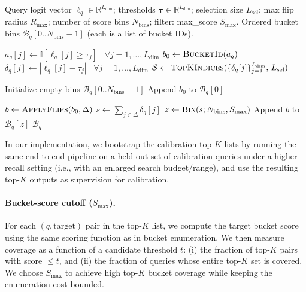 \documentclass[sigconf, nonacm]{acmart}
\begin{document}
\begin{algorithm}[t]
\caption{Bucket Enumeration around the Base Address}
\label{alg:bucket_enum}
\begin{algorithmic}[1]
\Require
Query logit vector $\boldsymbol{\ell}_q \in \mathbb{R}^{L_{\text{dim}}}$;
thresholds $\boldsymbol{\tau}\in\mathbb{R}^{L_{\text{dim}}}$;
selection size $L_{\text{sel}}$;
max flip radius $R_{\max}$;
number of score bins $N_{\text{bins}}$;
filter: max\_score $S_{\max}$.
\Ensure
Ordered bucket bins $\mathcal{B}_q[0..N_{\text{bins}}-1]$ (each is a list of bucket IDs).
 
\State $a_q[j] \gets \mathbb{I}\!\left[\ell_q[j] \ge \tau_j\right]\;\;\;\forall j=1,\dots,L_{\text{dim}}$
\State $b_0 \gets \textsc{BucketId}(a_q)$
\State $\delta_q[j] \gets \left|\ell_q[j]-\tau_j\right|\;\;\;\forall j=1,\dots,L_{\text{dim}}$
\State $\mathcal{S} \gets \textsc{TopKIndices}(\{\delta_q[j]\}_{j=1}^{L_{\text{dim}}},\, L_{\text{sel}})$
 
\State Initialize empty bins $\mathcal{B}_q[0..N_{\text{bins}}-1]$
\State Append $b_0$ to $\mathcal{B}_q[0]$ 
 
    \State $b \gets \textsc{ApplyFlips}(b_0, \Delta)$
    \State $s \gets \sum_{j\in\Delta}\delta_q[j]$
        \State $z \gets \textsc{Bin}(s; N_{\text{bins}}, S_{\max})$
        \State Append $b$ to $\mathcal{B}_q[z]$
    \EndIf
\EndFor
\State \Return $\mathcal{B}_q$
\end{algorithmic}
\end{algorithm}




In our implementation, we bootstrap the calibration top-$K$ lists by running the same end-to-end pipeline on a held-out set of calibration queries under a higher-recall setting (i.e., with an enlarged search budget/range), and use the resulting top-$K$ outputs as supervision for calibration.

\paragraph{Bucket-score cutoff ($S_{\max}$).}
For each $(q,\text{target})$ pair in the top-$K$ list, we compute the target bucket score using the same scoring function as in bucket enumeration.
We then measure coverage as a function of a candidate threshold $t$: (i) the fraction of top-$K$ pairs with score $\le t$, and (ii) the fraction of queries whose entire top-$K$ set is covered.
We choose $S_{\max}$ to achieve high top-$K$ bucket coverage while keeping the enumeration cost bounded.
\end{document}

